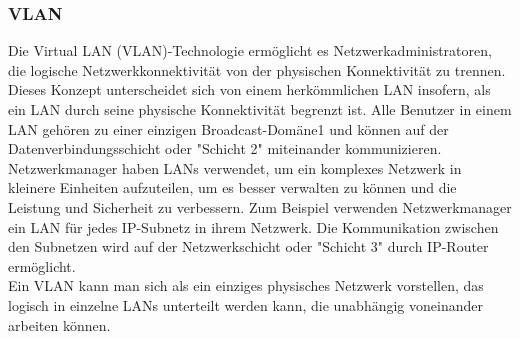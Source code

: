         \subsubsection{VLAN}
        Die Virtual LAN (VLAN)-Technologie ermöglicht es Netzwerkadministratoren, 
        die logische Netzwerkkonnektivität von der physischen Konnektivität zu trennen. 
        Dieses Konzept unterscheidet sich von einem herkömmlichen LAN insofern, als ein LAN 
        durch seine physische Konnektivität begrenzt ist. Alle Benutzer in einem LAN gehören 
        zu einer einzigen Broadcast-Domäne1 und können auf der Datenverbindungsschicht oder 
        "Schicht 2" miteinander kommunizieren. Netzwerkmanager haben LANs verwendet, um ein 
        komplexes Netzwerk in kleinere Einheiten aufzuteilen, um es besser verwalten zu können 
        und die Leistung und Sicherheit zu verbessern. Zum Beispiel verwenden Netzwerkmanager 
        ein LAN für jedes IP-Subnetz in ihrem Netzwerk. Die Kommunikation zwischen den Subnetzen 
        wird auf der Netzwerkschicht oder "Schicht 3" durch IP-Router ermöglicht.\\
        Ein VLAN kann man sich als ein einziges physisches Netzwerk vorstellen, das logisch in 
        einzelne LANs unterteilt werden kann, die unabhängig voneinander arbeiten können.

